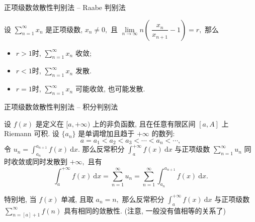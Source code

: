 
\begin{frame}{正项级数敛散性判别法 -- Raabe 判别法}

\begin{thm}
设 $\sum\limits_{n=1}^\infty x_n$ 是正项级数, $x_n \neq 0,$ 且 $\lim\limits_{n\to\infty} n \left( ~ \dfrac{x_n}{x_{n+1}} - 1 \right) = r,$ 那么
\begin{itemize}
\item $r > 1$时, $\sum\limits_{n=1}^\infty x_n$ 收敛;
\item $r < 1$时, $\sum\limits_{n=1}^\infty x_n$ 发散.
\item $r = 1$时, $\sum\limits_{n=1}^\infty x_n$ 可能收敛, 也可能发散.
\end{itemize}
\end{thm}

\end{frame}


\begin{frame}{正项级数敛散性判别法 -- 积分判别法}

设 $f(x)$ 是定义在 $[a, +\infty)$ 上的非负函数, 且在任意有限区间 $[a, A]$ 上 Riemann 可积. 设 $\{a_n\}$ 是单调增加且趋于 $+\infty$ 的数列:
\[a = a_1 < a_2 < a_3 < \cdots < a_n < \cdots,\]
令 $u_n = \int_{a_n}^{a_{n+1}} f(x) ~ \mathrm{d} x.$ 那么反常积分 $\int_a^{+\infty} f(x) ~ \mathrm{d} x$ 与正项级数 $\sum\limits_{n=1}^\infty u_n$ 同时收敛或同时发散到 $+\infty,$ 且有
\vspace{-1em}
\[\int_a^{+\infty} f(x) ~ \mathrm{d} x = \sum\limits_{n=1}^\infty u_n = \sum\limits_{n=1}^\infty \int_{a_n}^{a_{n+1}} f(x) ~ \mathrm{d} x.\]

\pause

特别地, 当 $f(x)$ 单减, 且取 $a_n = n,$ 那么反常积分 $\int_a^{+\infty} f(x) ~ \mathrm{d} x$ 与正项级数$\sum\limits_{n=[a]+1}^\infty f(n)$ 具有相同的敛散性. (注意, 一般没有值相等的关系了)

\end{frame}


